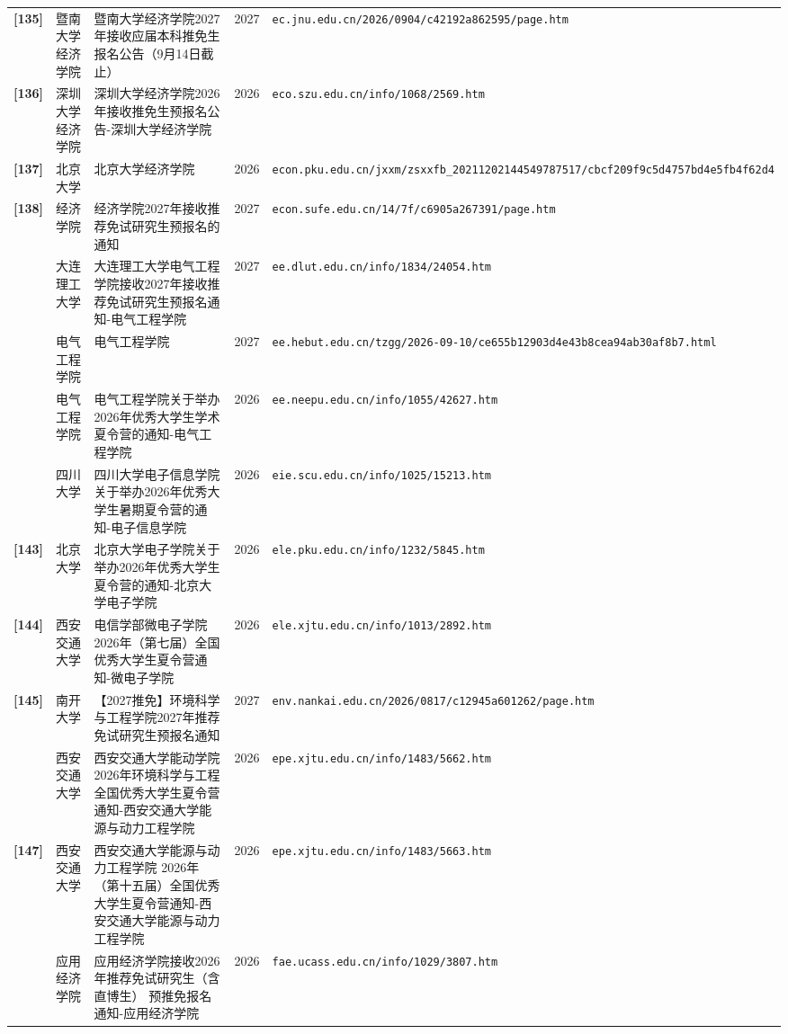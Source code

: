 {\begin{longtable}{@{}p{1.15cm}p{2.9cm}p{6.3cm}p{0.85cm}p{5.0cm}@{}}
\textbf{[135]} & 暨南大学经济学院 & 暨南大学经济学院2027年接收应届本科推免生报名公告（9月14日截止） & 2027 & \texttt{ec.jnu.edu.cn/2026/0904/c42192a862595/page.htm} \\
\textbf{[136]} & 深圳大学经济学院 & 深圳大学经济学院2026年接收推免生预报名公告-深圳大学经济学院 & 2026 & \texttt{eco.szu.edu.cn/info/1068/2569.htm} \\
\textbf{[137]} & 北京大学 & 北京大学经济学院 & 2026 & \texttt{econ.pku.edu.cn/jxxm/zsxxfb\_20211202144549787517/cbcf209f9c5d4757bd4e5fb4f62d4} \\
\textbf{[138]} & 经济学院 & 经济学院2027年接收推荐免试研究生预报名的通知 & 2027 & \texttt{econ.sufe.edu.cn/14/7f/c6905a267391/page.htm} \\
[139] & 大连理工大学 & 大连理工大学电气工程学院接收2027年接收推荐免试研究生预报名通知-电气工程学院 & 2027 & \texttt{ee.dlut.edu.cn/info/1834/24054.htm} \\
[140] & 电气工程学院 & 电气工程学院 & 2027 & \texttt{ee.hebut.edu.cn/tzgg/2026-09-10/ce655b12903d4e43b8cea94ab30af8b7.html} \\
[141] & 电气工程学院 & 电气工程学院关于举办2026年优秀大学生学术夏令营的通知-电气工程学院 & 2026 & \texttt{ee.neepu.edu.cn/info/1055/42627.htm} \\
[142] & 四川大学 & 四川大学电子信息学院 关于举办2026年优秀大学生暑期夏令营的通知-电子信息学院 & 2026 & \texttt{eie.scu.edu.cn/info/1025/15213.htm} \\
\textbf{[143]} & 北京大学 & 北京大学电子学院关于举办2026年优秀大学生夏令营的通知-北京大学电子学院 & 2026 & \texttt{ele.pku.edu.cn/info/1232/5845.htm} \\
\textbf{[144]} & 西安交通大学 & 电信学部微电子学院2026年（第七届）全国优秀大学生夏令营通知-微电子学院 & 2026 & \texttt{ele.xjtu.edu.cn/info/1013/2892.htm} \\
\textbf{[145]} & 南开大学 & 【2027推免】环境科学与工程学院2027年推荐免试研究生预报名通知 & 2027 & \texttt{env.nankai.edu.cn/2026/0817/c12945a601262/page.htm} \\
[146] & 西安交通大学 & 西安交通大学能动学院2026年环境科学与工程全国优秀大学生夏令营通知-西安交通大学能源与动力工程学院 & 2026 & \texttt{epe.xjtu.edu.cn/info/1483/5662.htm} \\
\textbf{[147]} & 西安交通大学 & 西安交通大学能源与动力工程学院 2026年（第十五届）全国优秀大学生夏令营通知-西安交通大学能源与动力工程学院 & 2026 & \texttt{epe.xjtu.edu.cn/info/1483/5663.htm} \\
[148] & 应用经济学院 & 应用经济学院接收2026年推荐免试研究生（含直博生） 预推免报名通知-应用经济学院 & 2026 & \texttt{fae.ucass.edu.cn/info/1029/3807.htm} \\

\end{longtable}}
